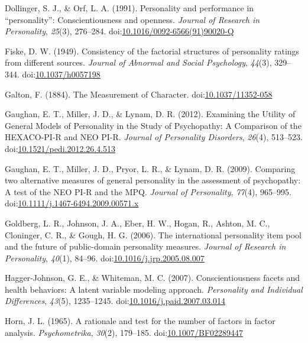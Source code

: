 \documentclass[,man,floatsintext]{apa6}
\begin{document}
\hypertarget{ref-Dollinger1991}{}
Dollinger, S. J., \& Orf, L. A. (1991). Personality and performance in
``personality'': Conscientiousness and openness. \emph{Journal of
Research in Personality}, \emph{25}(3), 276--284.
doi:\href{https://doi.org/10.1016/0092-6566(91)90020-Q}{10.1016/0092-6566(91)90020-Q}

\hypertarget{ref-Fiske1949}{}
Fiske, D. W. (1949). Consistency of the factorial structures of
personality ratings from different sources. \emph{Journal of Abnormal
and Social Psychology}, \emph{44}(3), 329--344.
doi:\href{https://doi.org/10.1037/h0057198}{10.1037/h0057198}

\hypertarget{ref-Galton1884}{}
Galton, F. (1884). The Measurement of Character.
doi:\href{https://doi.org/10.1037/11352-058}{10.1037/11352-058}

\hypertarget{ref-Gaughan2012}{}
Gaughan, E. T., Miller, J. D., \& Lynam, D. R. (2012). Examining the
Utility of General Models of Personality in the Study of Psychopathy: A
Comparison of the HEXACO-PI-R and NEO PI-R. \emph{Journal of Personality
Disorders}, \emph{26}(4), 513--523.
doi:\href{https://doi.org/10.1521/pedi.2012.26.4.513}{10.1521/pedi.2012.26.4.513}

\hypertarget{ref-Gaughan2009}{}
Gaughan, E. T., Miller, J. D., Pryor, L. R., \& Lynam, D. R. (2009).
Comparing two alternative measures of general personality in the
assessment of psychopathy: A test of the NEO PI-R and the MPQ.
\emph{Journal of Personality}, \emph{77}(4), 965--995.
doi:\href{https://doi.org/10.1111/j.1467-6494.2009.00571.x}{10.1111/j.1467-6494.2009.00571.x}

\hypertarget{ref-Goldberg2006}{}
Goldberg, L. R., Johnson, J. A., Eber, H. W., Hogan, R., Ashton, M. C.,
Cloninger, C. R., \& Gough, H. G. (2006). The international personality
item pool and the future of public-domain personality measures.
\emph{Journal of Research in Personality}, \emph{40}(1), 84--96.
doi:\href{https://doi.org/10.1016/j.jrp.2005.08.007}{10.1016/j.jrp.2005.08.007}

\hypertarget{ref-Hagger-Johnson2007}{}
Hagger-Johnson, G. E., \& Whiteman, M. C. (2007). Conscientiousness
facets and health behaviors: A latent variable modeling approach.
\emph{Personality and Individual Differences}, \emph{43}(5), 1235--1245.
doi:\href{https://doi.org/10.1016/j.paid.2007.03.014}{10.1016/j.paid.2007.03.014}

\hypertarget{ref-Horn1965}{}
Horn, J. L. (1965). A rationale and test for the number of factors in
factor analysis. \emph{Psychometrika}, \emph{30}(2), 179--185.
doi:\href{https://doi.org/10.1007/BF02289447}{10.1007/BF02289447}
\end{document}
